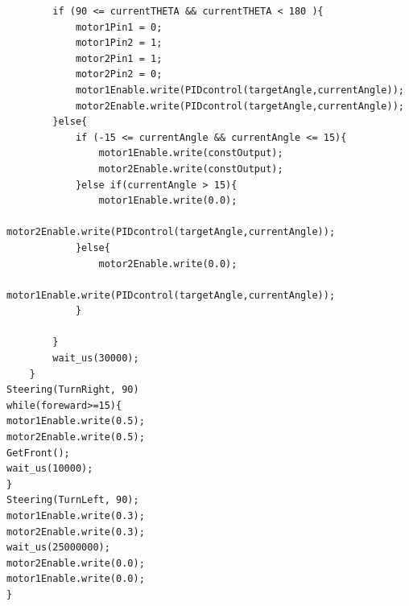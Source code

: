 \documentclass[12pt, a4paper, oneside]{report}
\begin{document}
\begin{lstlisting}
        if (90 <= currentTHETA && currentTHETA < 180 ){
            motor1Pin1 = 0;
            motor1Pin2 = 1;
            motor2Pin1 = 1;
            motor2Pin2 = 0;
            motor1Enable.write(PIDcontrol(targetAngle,currentAngle));
            motor2Enable.write(PIDcontrol(targetAngle,currentAngle));
        }else{
            if (-15 <= currentAngle && currentAngle <= 15){
                motor1Enable.write(constOutput);
                motor2Enable.write(constOutput);
            }else if(currentAngle > 15){
                motor1Enable.write(0.0);
                motor2Enable.write(PIDcontrol(targetAngle,currentAngle));
            }else{
                motor2Enable.write(0.0);
                motor1Enable.write(PIDcontrol(targetAngle,currentAngle));
            }

        }
        wait_us(30000);
    } 
Steering(TurnRight, 90)
while(foreward>=15){
motor1Enable.write(0.5);
motor2Enable.write(0.5);
GetFront();
wait_us(10000);
}
Steering(TurnLeft, 90);
motor1Enable.write(0.3);
motor2Enable.write(0.3);
wait_us(25000000);
motor2Enable.write(0.0);
motor1Enable.write(0.0);
}
\end{lstlisting}
\newpage
\end{document}
